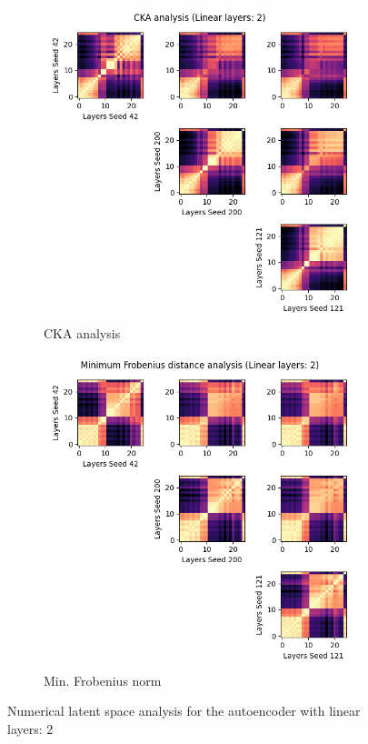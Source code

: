 \documentclass[../main.tex]{subfiles}
\begin{document}
\begin{figure}[ht!]
     \centering
    \begin{subfigure}[b]{0.45\textwidth}
         \centering
        \includegraphics[width=\textwidth]{figures/rs/sim_ae/cka_2__42_200_121.png} 
        \caption{CKA analysis}
        \label{fig:cka_ae_2}
     \end{subfigure}\hfill
      \begin{subfigure}[b]{0.45\textwidth}
         \centering
         \includegraphics[width=\textwidth]{figures/rs/sim_ae/frob_2__42_200_121.png}
        \caption{Min. Frobenius norm}
         \label{fig:frob_ae_2}
     \end{subfigure}
    \caption{Numerical latent space analysis for the autoencoder with linear layers: 2}
    \label{fig:lat_num_ae_2}
\end{figure}
\end{document}
